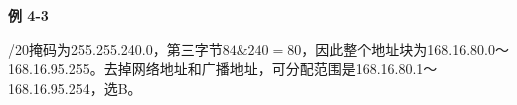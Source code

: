 {\color{ink}\bfseries 例 4-3}\par\vspace{1bp}/\allowbreak{}20掩码为255.255.240.0，第三字节\(84 \mathbin{\&} 240=\allowbreak{}80\)，因此整个地址块为168.16.80.0～168.16.95.255。去掉网络地址和广播地址，可分配范围是168.16.80.1～168.16.95.254，选B。
